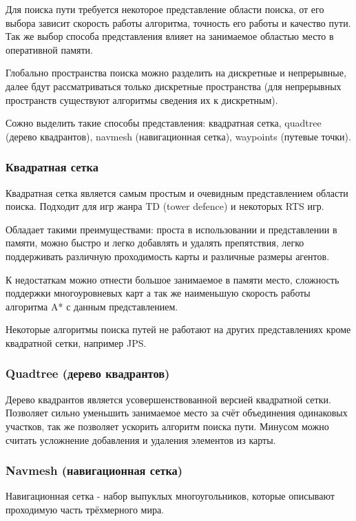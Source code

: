 Для поиска пути требуется некоторое представление области поиска, от его выбора зависит скорость работы алгоритма, точность его работы и качество пути. Так же выбор способа представления влияет на занимаемое областью место в оперативной памяти. 

Глобально пространства поиска можно разделить на дискретные и непрерывные, далее бдут рассматриваться только дискретные пространства (для непрерывных пространств существуют алгоритмы сведения их к дискретным).  

Сожно выделить такие способы представления: квадратная сетка, quadtree (дерево квадрантов), navmesh (навигационная сетка), waypoints (путевые точки).

\subsubsection{Квадратная сетка}

Квадратная сетка является самым простым и очевидным представлением области поиска. Подходит для игр жанра TD (tower defence) и некоторых RTS игр. 

Обладает такими преимуществами: проста в использовании и представлении в памяти, можно быстро и легко добавлять и удалять препятствия, легко поддерживать различную проходимость карты и различные размеры агентов. 

К недостаткам можно отнести большое занимаемое в памяти место, сложность поддержки многоуровневых карт а так же наименьшую скорость работы алгоритма A* с данным представлением. 

Некоторые алгоритмы поиска путей не работают на других представлениях кроме квадратной сетки, например JPS.

\subsubsection{Quadtree (дерево квадрантов)}

Дерево квадрантов является усовершенствованной версией квадратной сетки. Позволяет сильно уменьшить занимаемое место за счёт объединения одинаковых участков, так же позволяет ускорить алгоритм поиска пути. Минусом можно считать усложнение добавления и удаления элементов из карты.

\subsubsection{Navmesh (навигационная сетка)}

Навигационная сетка - набор выпуклых многоугольников, которые описывают проходимую часть трёхмерного мира. 

